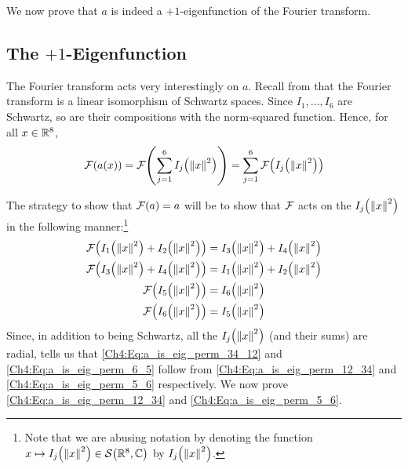 We now prove that $a$ is indeed a $+1$-eigenfunction of the Fourier transform.

\subsection{The $+1$-Eigenfunction}
\label{Ch4:Subsec:Eigenfun_a}

The Fourier transform acts very interestingly on $a$. Recall from  that the Fourier transform is a linear isomorphism of Schwartz spaces. Since $I_1, \ldots, I_6$ are Schwartz, so are their compositions with the norm-squared function. Hence, for all $x \in \mathbb{R}^8$,
\begin{align*}
    \mathcal{F}\!\left( a(x) \right)
    = \mathcal{F}\!\left( \sum_{j=1}^{6} I_j\!\left( \left\lVert x \right\rVert^2 \right) \right)
    = \sum_{j=1}^{6} \mathcal{F}\!\left( I_j\!\left( \left\lVert x \right\rVert^2 \right) \right)
\end{align*}

The strategy to show that $\mathcal{F}\!\left( a \right) = a$ will be to show that $\mathcal{F}$ acts on the $I_j\!\left( \left\lVert x \right\rVert^2 \right)$ in the following manner:\footnote{Note that we are abusing notation by denoting the function $x \mapsto I_j\!\left( \left\lVert x \right\rVert^2 \right) \in \mathcal{S}\!\left( \mathbb{R}^8, \mathbb{C} \right)$ by $I_j\!\left( \left\lVert x \right\rVert^2 \right)$.}
\begin{align}
    \F\of{I_1\of{\norm{x}^2} + I_2\of{\norm{x}^2}} &= I_3\of{\norm{x}^2} + I_4\of{\norm{x}^2} \label{Ch4:Eq:a_is_eig_perm_12_34} \\
    \F\of{I_3\of{\norm{x}^2} + I_4\of{\norm{x}^2}} &= I_1\of{\norm{x}^2} + I_2\of{\norm{x}^2} \label{Ch4:Eq:a_is_eig_perm_34_12} \\
    \F\of{I_5\of{\norm{x}^2}} &= I_6\of{\norm{x}^2} \label{Ch4:Eq:a_is_eig_perm_5_6} \\
    \F\of{I_6\of{\norm{x}^2}} &= I_5\of{\norm{x}^2} \label{Ch4:Eq:a_is_eig_perm_6_5}
\end{align}
Since, in addition to being Schwartz, all the $I_j\!\left( \left\lVert x \right\rVert^2 \right)$ (and their sums) are radial,  tells us that \eqref{Ch4:Eq:a_is_eig_perm_34_12} and \eqref{Ch4:Eq:a_is_eig_perm_6_5} follow from \eqref{Ch4:Eq:a_is_eig_perm_12_34} and \eqref{Ch4:Eq:a_is_eig_perm_5_6} respectively. We now prove \eqref{Ch4:Eq:a_is_eig_perm_12_34} and \eqref{Ch4:Eq:a_is_eig_perm_5_6}.


